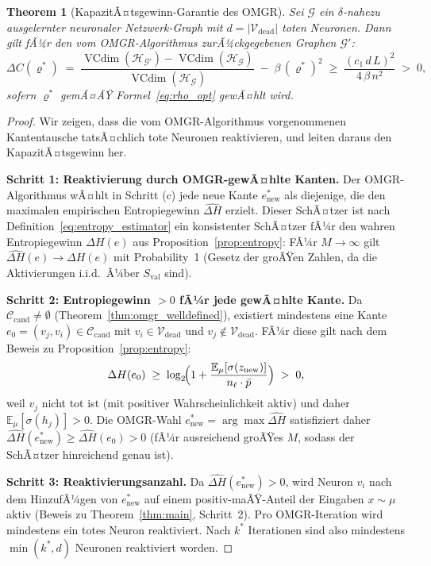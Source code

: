﻿\documentclass[12pt, a4paper, openany]{report}
\newtheorem{theorem}{Theorem}[chapter]
\newcommand{\E}{\mathbb{E}}
\newcommand{\calG}{\mathcal{G}}
\newcommand{\calH}{\mathcal{H}}
\newcommand{\calV}{\mathcal{V}}
\newcommand{\calC}{\mathcal{C}}
\DeclareMathOperator{\VC}{VCdim}
\begin{document}
\begin{theorem}[KapazitÃ¤tsgewinn-Garantie des OMGR]
\label{thm:omgr_capacity}
Sei $\calG$ ein $\delta$-nahezu ausgelernter neuronaler Netzwerk-Graph mit
$d = |\calV_{\mathrm{dead}}|$ toten Neuronen.  Dann gilt fÃ¼r den vom
OMGR-Algorithmus zurÃ¼ckgegebenen Graphen $\calG'$:
\begin{equation}
  \label{eq:omgr_capacity}
  \Delta C(\varrho^*)
  \;=\;
  \frac{\VC(\calH_{\calG'}) - \VC(\calH_{\calG})}{\VC(\calH_{\calG})}
  \;-\; \beta\,(\varrho^*)^2
  \;\geq\;
  \frac{(c_1\,d\,L)^2}{4\,\beta\,n^2}
  \;>\; 0,
\end{equation}
sofern $\varrho^*$ gemÃ¤ÃŸ Formel~\eqref{eq:rho_opt} gewÃ¤hlt wird.
\end{theorem}

\begin{proof}
Wir zeigen, dass die vom OMGR-Algorithmus vorgenommenen Kantentausche
tatsÃ¤chlich tote Neuronen reaktivieren, und leiten daraus den
KapazitÃ¤tsgewinn her.

\textbf{Schritt 1: Reaktivierung durch OMGR-gewÃ¤hlte Kanten.}
Der OMGR-Algo\-rithmus wÃ¤hlt in Schritt (c) jede neue Kante $e_{\mathrm{new}}^*$
als diejenige, die den maximalen empirischen Entropiegewinn $\widehat{\Delta H}$
erzielt.  Dieser SchÃ¤tzer ist nach Definition~\eqref{eq:entropy_estimator}
ein konsistenter SchÃ¤tzer fÃ¼r den wahren Entropiegewinn $\Delta H(e)$
aus Proposition~\ref{prop:entropy}: FÃ¼r $M \to \infty$ gilt
$\widehat{\Delta H}(e) \to \Delta H(e)$ mit Probability~1 (Gesetz der
groÃŸen Zahlen, da die Aktivierungen i.i.d.\ Ã¼ber $S_{\mathrm{val}}$ sind).

\textbf{Schritt 2: Entropiegewinn $>0$ fÃ¼r jede gewÃ¤hlte Kante.}
Da $\calC_{\mathrm{cand}} \neq \emptyset$ (Theorem~\ref{thm:omgr_welldefined}),
existiert mindestens eine Kante $e_0 = (v_j, v_i) \in \calC_{\mathrm{cand}}$
mit $v_i \in \calV_{\mathrm{dead}}$ und $v_j \notin \calV_{\mathrm{dead}}$.
FÃ¼r diese gilt nach dem Beweis zu Proposition~\ref{prop:entropy}:
\[
  \Delta H(e_0) \;\geq\;
  \log_2\!\Bigl(1 + \frac{\E_\mu[\sigma(z_{\mathrm{new}})]}{n_\ell \cdot \bar p}\Bigr)
  \;>\; 0,
\]
weil $v_j$ nicht tot ist (mit positiver Wahrscheinlichkeit aktiv) und
daher $\E_\mu[\sigma(h_j)] > 0$.  Die OMGR-Wahl $e_{\mathrm{new}}^* = \arg\max \widehat{\Delta H}$
satisfiziert daher $\widehat{\Delta H}(e_{\mathrm{new}}^*) \geq \widehat{\Delta H}(e_0) > 0$
(fÃ¼r ausreichend groÃŸes $M$, sodass der SchÃ¤tzer hinreichend genau ist).

\textbf{Schritt 3: Reaktivierungsanzahl.}
Da $\widehat{\Delta H}(e_{\mathrm{new}}^*) > 0$, wird Neuron $v_i$ nach dem
HinzufÃ¼gen von $e_{\mathrm{new}}^*$ auf einem positiv-maÃŸ-Anteil der
Eingaben $x \sim \mu$ aktiv (Beweis zu Theorem~\ref{thm:main}, Schritt~2).
Pro OMGR-Iteration wird mindestens ein totes Neuron reaktiviert.
Nach $k^*$ Iterationen sind also mindestens $\min(k^*, d)$ Neuronen
reaktiviert worden.


\end{proof}
\end{document}
